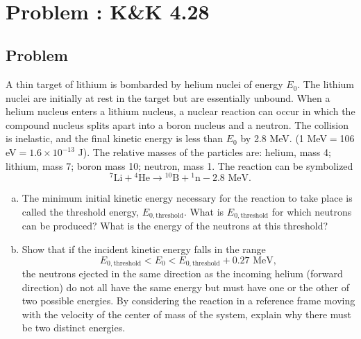 \documentclass[solutions]{esg8012pset}
\begin{document}
\begin{align*}
  \end{align*}
\section{Problem \thesection: K\&K 4.28}
\subsection{Problem}
  A thin target of lithium is bombarded by helium nuclei of energy $E_0$. The lithium nuclei are initially at rest in the target but are essentially unbound. When a helium nucleus enters a lithium nucleus, a nuclear reaction can occur in which the compound nucleus splits apart into a boron nucleus and a neutron. The collision is inelastic, and the final kinetic energy is less than $E_0$ by 2.8 MeV. (1 MeV$ = $106 eV$ = 1.6 \times 10^{-13}$ J). The relative masses of the particles are: helium, mass 4; lithium, mass 7; boron mass 10; neutron, mass 1. The reaction can be symbolized
  $${}^7\text{Li} + {}^4\text{He} \to {}^{10}\text{B} + {}^1\text{n} - 2.8\text{ MeV}.$$
  \begin{enumerate}[(a)]
  \item The minimum initial kinetic energy necessary for the reaction to take place is called the threshold energy, $E_{0,\text{threshold}}$. What is $E_{0,\text{threshold}}$ for which neutrons can be produced? What is the energy of the neutrons at this threshold?
    \item Show that if the incident kinetic energy falls in the range $$E_{0,\text{threshold}} < E_0 < E_{0,\text{threshold}} + 0.27\text{ MeV},$$ the neutrons ejected in the same direction as the incoming helium (forward direction) do not all have the same energy but must have one or the other of two possible energies. By considering the reaction in a reference frame moving with the velocity of the center of mass of the system, explain why there must be two distinct energies.
  \end{enumerate}
\end{document}

